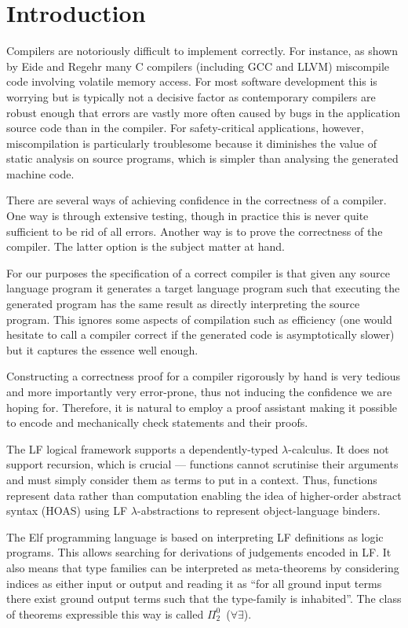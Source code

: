 \section{Introduction}
Compilers are notoriously difficult to implement correctly.
For instance, as shown by Eide and Regehr \cite{EideRegehr08} many C compilers (including GCC and LLVM) miscompile code involving volatile memory access.
For most software development this is worrying but is typically not a decisive factor as contemporary compilers are robust enough that errors are vastly more often caused by bugs in the application source code than in the compiler.
For safety-critical applications, however, miscompilation is particularly troublesome because it diminishes the value of static analysis on source programs, which is simpler than analysing the generated machine code.

There are several ways of achieving confidence in the correctness of a compiler.
One way is through extensive testing, though in practice this is never quite sufficient to be rid of all errors.
Another way is to prove the correctness of the compiler.
The latter option is the subject matter at hand.

For our purposes the specification of a correct compiler is that given any source language program it generates a target language program such that executing the generated program has the same result as directly interpreting the source program.
This ignores some aspects of compilation such as efficiency (one would hesitate to call a compiler correct if the generated code is asymptotically slower) but it captures the essence well enough.

Constructing a correctness proof for a compiler rigorously by hand is very tedious and more importantly very error-prone, thus not inducing the confidence we are hoping for.
Therefore, it is natural to employ a proof assistant making it possible to encode and mechanically check statements and their proofs.

The LF logical framework \cite{Pfenning01} supports a dependently-typed $\lambda$-calculus.
It does not support recursion, which is crucial --- functions cannot scrutinise their arguments and must simply consider them as terms to put in a context.
Thus, functions represent data rather than computation enabling the idea of higher-order abstract syntax (HOAS) using LF $\lambda$-abstractions to represent object-language binders.

The Elf programming language is based on interpreting LF definitions as logic programs.
This allows searching for derivations of judgements encoded in LF.
It also means that type families can be interpreted as meta-theorems by considering indices as either input or output and reading it as ``for all ground input terms there exist ground output terms such that the type-family is inhabited''.
The class of theorems expressible this way is called $\Pi_2^0$~($\forall \exists$).

